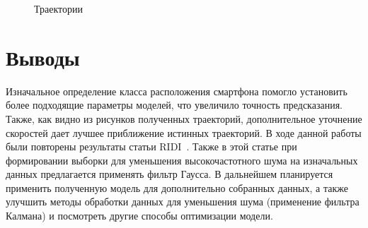 \documentclass[12pt,twoside]{article}
\begin{document}
\begin{figure}[h]
\begin{minipage}[h]{0.49\linewidth}
\end{minipage}
\hfill
\begin{minipage}[h]{0.49\linewidth}
\end{minipage}
\caption{Траектории}
\label{ris:image1}
\end{figure}

\section{Выводы}

Изначальное определение класса расположения смартфона помогло установить более подходящие параметры моделей, что увеличило точность предсказания. Также, как видно из рисунков полученных траекторий, дополнительное уточнение скоростей дает лучшее приближение истинных траекторий. В ходе данной работы были повторены результаты статьи RIDI~\cite{journals/corr/abs-1712-09004}. Также в этой статье при формировании выборки для уменьшения высокочастотного шума на изначальных данных предлагается применять фильтр Гаусса. В дальнейшем планируется применить полученную модель для дополнительно собранных данных, а также улучшить методы обработки данных для уменьшения шума (применение фильтра Калмана) и посмотреть другие способы оптимизации модели.
\end{document}
